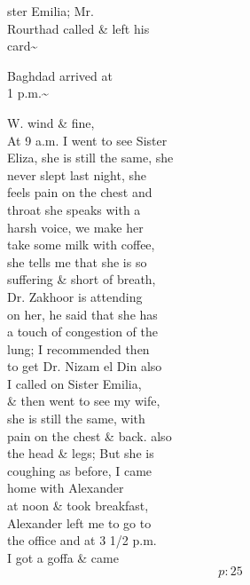 \documentclass{report}
\begin{document}

	\par{
 	ster Emilia; Mr.\ \\Rourthad called \& left his\ \\card\~{}\ \\
	}

	\par{
 	Baghdad arrived at\ \\1 p.m.\~{}\ \\
	}


	\par{
 	W. wind \& fine,\ \\At 9 a.m. I went to see Sister\ \\Eliza, she is still the same, she\ \\never slept last night, she\ \\feels pain on the chest and\ \\throat she speaks with a\ \\harsh voice, we make her\ \\take some milk with coffee,\ \\she tells me that she is so\ \\suffering \& short of breath,\ \\Dr. Zakhoor is attending\ \\on her, he said that she has\ \\a touch of congestion of the\ \\lung; I recommended then\ \\to get Dr. Nizam el Din also\ \\I called on Sister Emilia,\ \\\& then went to see my wife,\ \\she is still the same, with\ \\pain on the chest \& back. also\ \\the head \& legs; But she is\ \\coughing as before, I came\ \\home with Alexander\ \\at noon \& took breakfast,\ \\Alexander left me to go to\ \\the office and at 3 1/2 p.m.\ \\I got a goffa \& came\ \\
  \[p: 25 \]

	}

\end{document}
